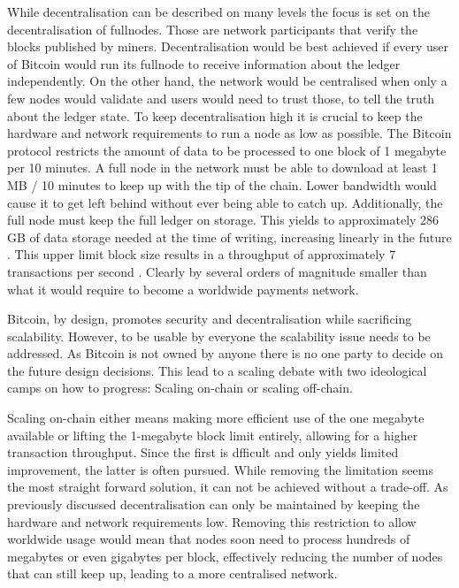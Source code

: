 \documentclass[final]{fhnwreport}       %
\begin{document}
While decentralisation can be described on many levels the focus is set on the decentralisation of \glspl{fullnode}. Those are network participants that verify the blocks published by miners. Decentralisation would be best achieved if every user of Bitcoin would run its \gls{fullnode} to receive information about the ledger independently. On the other hand, the network would be centralised when only a few nodes would validate and users would need to trust those, to tell the truth about the ledger state. To keep decentralisation high it is crucial to keep the hardware and network requirements to run a node as low as possible. The Bitcoin protocol restricts the amount of data to be processed to one block of 1 megabyte per 10 minutes. A full node in the network must be able to download at least 1 MB / 10 minutes to keep up with the tip of the chain. Lower bandwidth would cause it to get left behind without ever being able to catch up. Additionally, the full node must keep the full ledger on storage. This yields to approximately 286 GB of data storage needed at the time of writing, increasing linearly in the future \citep{noauthor_block-size_nodate}. This upper limit block size results in a throughput of approximately 7 transactions per second \citep{poon_bitcoin_2016}. Clearly by several orders of magnitude smaller than what it would require to become a worldwide payments network. 

Bitcoin, by design, promotes security and decentralisation while sacrificing scalability. However, to be usable by everyone the scalability issue needs to be addressed. As Bitcoin is not owned by anyone there is no one party to decide on the future design decisions. This lead to a scaling debate with two ideological camps on how to progress: Scaling on-chain or scaling off-chain.

Scaling on-chain either means making more efficient use of the one megabyte available or lifting the 1-megabyte block limit entirely, allowing for a higher transaction throughput. Since the first is dfficult and only yields limited improvement, the latter is often pursued. While removing the limitation seems the most straight forward solution, it can not be achieved without a trade-off. As previously discussed decentralisation can only be maintained by keeping the hardware and network requirements low. Removing this restriction to allow worldwide usage would mean that nodes soon need to process hundreds of megabytes or even gigabytes per block, effectively reducing the number of nodes that can still keep up, leading to a more centralised network. 
\end{document}
